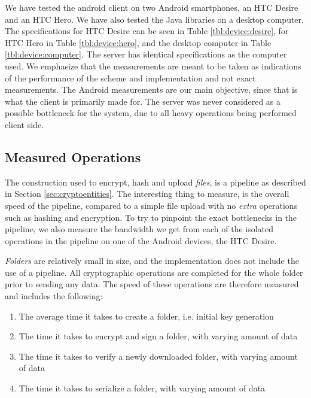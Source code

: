 \documentclass[pdftex,english,10pt,b5paper,twoside]{book}
\begin{document}
We have tested the android client on two Android smartphones, an HTC Desire and
an HTC Hero. We have also tested the Java libraries on a desktop computer. The
specifications for HTC Desire can be seen in Table \ref{tbl:device:desire}, for
HTC Hero in Table \ref{tbl:device:hero}, and the desktop computer in Table
\ref{tbl:device:computer}. The server has identical specifications as the
computer used. We emphasize that the measurements are meant to be taken as
indications of the performance of the scheme and implementation and not exact
measurements. The Android measurements are our main objective, since that is
what the client is primarily made for. The server was never considered as a
possible bottleneck for the system, due to all heavy operations being performed
client side.





\subsection{Measured Operations}

The construction used to encrypt, hash and upload \emph{files}, is a pipeline
as described in Section \ref{sec:cryptoentities}. The interesting thing to
measure, is the overall speed of the pipeline, compared to a simple file upload
with no \emph{extra} operations such as hashing and encryption. To try to
pinpoint the exact bottlenecks in the pipeline, we also measure the bandwidth
we get from each of the isolated operations in the pipeline on one of the
Android devices, the HTC Desire.

\emph{Folders} are relatively small in size, and the implementation does not
include the use of a pipeline. All cryptographic operations are completed for
the whole folder prior to sending any data. The speed of these operations are
therefore measured and includes the following:

\begin{enumerate}
    \item The average time it takes to create a folder, i.e. initial key
        generation
    \item The time it takes to encrypt and sign a folder, with varying amount
        of data
    \item The time it takes to verify a newly downloaded folder, with varying
        amount of data
    \item The time it takes to serialize a folder, with varying amount of data
\end{enumerate}
\end{document}
